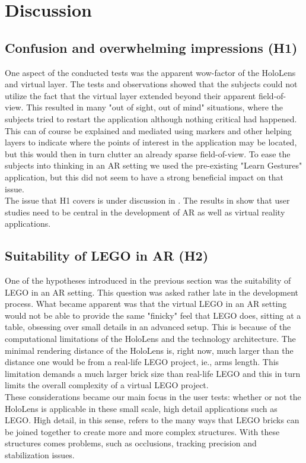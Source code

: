 
\section{Discussion}

\subsection{Confusion and overwhelming impressions (H1)}
One aspect of the conducted tests was the apparent wow-factor of the HoloLens and virtual layer. The tests and observations showed that the subjects could not utilize the fact that the virtual layer extended beyond their apparent field-of-view. This resulted in many "out of sight, out of mind" situations, where the subjects tried to restart the application although nothing critical had happened. This can of course be explained and mediated using markers and other helping layers to indicate where the points of interest in the application may be located, but this would then in turn clutter an already sparse field-of-view. To ease the subjects into thinking in an AR setting we used the pre-existing "Learn Gestures" application, but this did not seem to have a strong beneficial impact on that issue.\\
The issue that H1 covers is under discussion in \cite{kim}. The results in \cite{kim} show that user studies need to be central in the development of AR as well as virtual reality applications. 

\subsection{Suitability of LEGO in AR (H2)}
One of the hypotheses introduced in the previous section was the suitability of LEGO in an AR setting. This question was asked rather late in the development process. What became apparent was that the virtual LEGO in an AR setting would not be able to provide the same "finicky" feel that LEGO does, sitting at a table, obsessing over small details in an advanced setup. This is because of the computational limitations of the HoloLens and the technology architecture. The minimal rendering distance of the HoloLens is, right now, much larger than the distance one would be from a real-life LEGO project, ie., arms length. This limitation demands a much larger brick size than real-life LEGO and this in turn limits the overall complexity of a virtual LEGO project. \\
These considerations became our main focus in the user tests: whether or not the HoloLens is applicable in these small scale, high detail applications such as LEGO. High detail, in this sense, refers to the many ways that LEGO bricks can be joined together to create more and more complex structures. With these structures comes problems, such as occlusions, tracking precision and stabilization issues. 